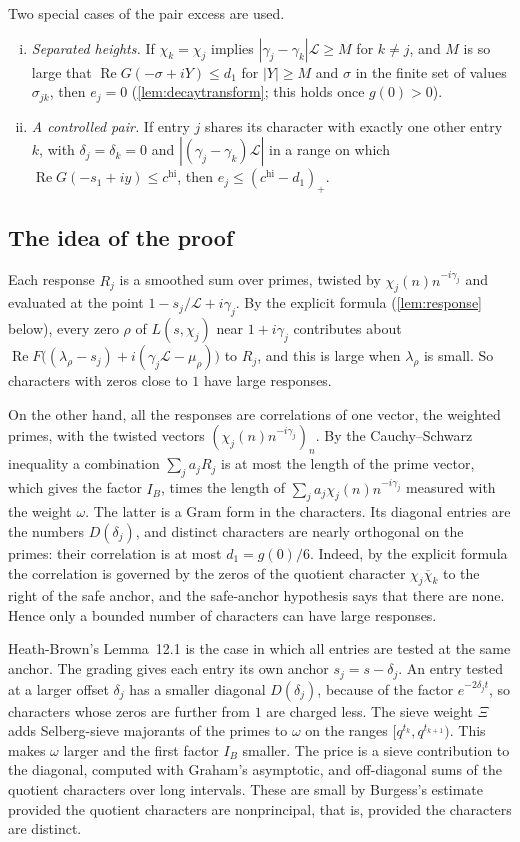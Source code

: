 \documentclass[11pt]{amsart}
\numberwithin{equation}{section}
\theoremstyle{plain}
\theoremstyle{definition}
\theoremstyle{remark}
\newcommand{\LL}{\mathcal{L}}
\renewcommand{\Re}{\operatorname{Re}}
\newcommand{\hi}{\mathrm{hi}}
\newcommand{\1}{\mathbf{1}}
\newcommand{\bchi}{\overline{\chi}}
\begin{document}
Two special cases of the pair excess are used.
\begin{enumerate}[(i)]
  \item \emph{Separated heights.} If $\chi_k=\chi_j$ implies $|\gamma_j-\gamma_k|\LL\ge M$ for $k\ne j$,
    and $M$ is so large that $\Re G(-\sigma+iY)\le d_1$ for $|Y|\ge M$ and $\sigma$ in the finite set
    of values $\sigma_{jk}$, then $e_j=0$ (\cref{lem:decaytransform}; this holds once $g(0)>0$).
  \item \emph{A controlled pair.} If entry $j$ shares its character with exactly one other entry
    $k$, with $\delta_j=\delta_k=0$ and $|(\gamma_j-\gamma_k)\LL|$ in a range on which
    $\Re G(-s_1+iy)\le c^{\hi}$, then $e_j\le(c^{\hi}-d_1)_+$.
\end{enumerate}

\subsection{The idea of the proof}\label{subsec:nearidea}
Each response $R_j$ is a smoothed sum over primes, twisted by $\chi_j(n)n^{-i\gamma_j}$ and
evaluated at the point $1-s_j/\LL+i\gamma_j$. By the explicit formula (\cref{lem:response} below),
every zero $\rho$ of $L(s,\chi_j)$ near $1+i\gamma_j$ contributes about
$\Re F\bigl((\lambda_\rho-s_j)+i(\gamma_j\LL-\mu_\rho)\bigr)$ to $R_j$, and this is large when $\lambda_\rho$ is small.
So characters with zeros close to $1$ have large responses.

On the other hand, all the responses are correlations of one vector, the weighted primes,
with the twisted vectors $(\chi_j(n)n^{-i\gamma_j})_n$. By the Cauchy--Schwarz inequality a
combination $\sum_ja_jR_j$ is at most the length of the prime vector, which gives the factor
$I_B$, times the length of $\sum_ja_j\chi_j(n)n^{-i\gamma_j}$ measured with the weight $\omega$. The
latter is a Gram form in the characters. Its diagonal entries are the numbers $D(\delta_j)$, and
distinct characters are nearly orthogonal on the primes: their correlation is at most
$d_1=g(0)/6$. Indeed, by the explicit formula the correlation is governed by the zeros of the
quotient character $\chi_j\bchi_k$ to the right of the safe anchor, and the safe-anchor
hypothesis says that there are none. Hence only a bounded number of characters can have large
responses.

Heath-Brown's Lemma~12.1 is the case in which all entries are tested at the same anchor. The
grading gives each entry its own anchor $s_j=s-\delta_j$. An entry tested at a larger offset
$\delta_j$ has a smaller diagonal $D(\delta_j)$, because of the factor $e^{-2\delta_jt}$, so characters
whose zeros are further from $1$ are charged less. The sieve weight $\Xi$ adds Selberg-sieve
majorants of the primes to $\omega$ on the ranges $[q^{t_k},q^{t_{k+1}})$. This makes $\omega$ larger and
the first factor $I_B$ smaller. The price is a sieve contribution to the diagonal, computed with
Graham's asymptotic, and off-diagonal sums of the quotient characters over long intervals. These
are small by Burgess's estimate provided the quotient characters are nonprincipal, that is,
provided the characters are distinct.
\end{document}
